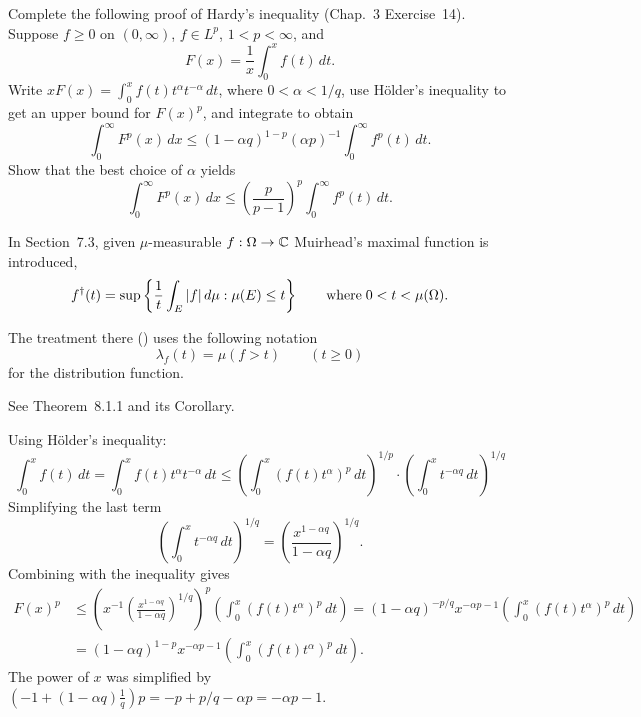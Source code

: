 \begin{enumerate}
\begin{excopy}
Complete the following proof of Hardy's
inequality
(Chap.~3 Exercise~14).
Suppose \(f\geq 0\) on \((0,\infty)\), \(f\in L^p\), \(1<p<\infty\), and
\begin{equation*}
F(x) = \frac{1}{x}\int_0^x f(t)\,dt.
\end{equation*}
Write \(xF(x) = \int_0^x f(t)t^\alpha t^{-\alpha}\,dt\),
where \(0<\alpha<1/q\), use H\"older's inequality 
to get an upper bound for
\(F(x)^p\), and integrate to obtain
\begin{equation*}
\int_0^\infty F^p(x)\,dx 
\leq 
(1-\alpha q)^{1-p} (\alpha p)^{-1} \int_0^\infty f^p(t)\,dt.
\end{equation*}
Show that the best choice of \(\alpha\) yields
\begin{equation*}
\int_0^\infty F^p(x)\,dx 
\leq 
\left(\frac{p}{p-1}\right)^{p} \int_0^\infty f^p(t)\,dt.
\end{equation*}
\end{excopy}

In \cite{Garling2007} Section~7.3,
given \(\mu\)-measurable \(f:\Omega\to\mathbb{C}\)
Muirhead's maximal function is introduced, 
\begin{equation*}
f^\dagger(t) = \sup\left\{\frac{1}{t}\int_E|f|\,d\mu: \mu(E)\leq t\right\}
\qquad \textnormal{where}\; 0 < t < \mu(\Omega).
\end{equation*}

The treatment there (\cite{Garling2007}) uses
the following notation
\begin{equation*}
\lambda_f(t) = \mu(f > t) \qquad (t\geq 0)
\end{equation*}
for the distribution function.


See \cite{Garling2007} Theorem~8.1.1 and its Corollary.

Using H\"older's inequality:
\begin{equation*}
\int_0^x f(t)\,dt
= \int_0^x f(t)t^\alpha t^{-\alpha}\,dt
\leq \left(\int_0^x \left(f(t)t^\alpha\right)^p\,dt\right)^{1/p}
      \cdot \left(\int_0^x t^{-\alpha q}\,dt\right)^{1/q}
\end{equation*}
Simplifying the last term
\begin{equation*}
\left(\int_0^x t^{-\alpha q}\,dt\right)^{1/q}
= \left(\frac{x^{1-\alpha q}}{1-\alpha q}\right)^{1/q}.
\end{equation*}
Combining with the inequality gives
\begin{align*}
F(x)^p
&\leq \left(x^{-1} \left(\frac{x^{1-\alpha q}}{1-\alpha q}\right)^{1/q}\right)^p
      \left(\int_0^x \left(f(t)t^\alpha\right)^p\,dt\right)
 = (1-\alpha q)^{-p/q} x^{-\alpha p - 1}
   \left(\int_0^x \left(f(t)t^\alpha\right)^p\,dt\right) \\
&= (1-\alpha q)^{1-p} x^{-\alpha p - 1}
   \left(\int_0^x \left(f(t)t^\alpha\right)^p\,dt\right).
\end{align*}
The power of $x$ was simplified
by \((-1 + (1-\alpha q)\frac{1}{q})p = -p + p/q - \alpha p = -\alpha p - 1\).


\end{enumerate}
